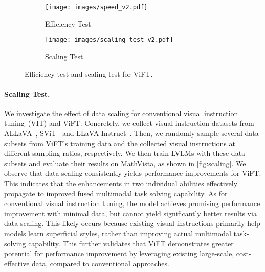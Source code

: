 \begin{figure}[t]
  \begin{subfigure}[b]{0.48\linewidth}
  \centering
    \texttt{[image: images/speed\_v2.pdf]}
    \caption{Efficiency Test}
    \label{fig:speed}
  \end{subfigure}\hfill
  \begin{subfigure}[b]{0.48\linewidth}
  \centering
    \texttt{[image: images/scaling\_test\_v2.pdf]}
    \caption{Scaling Test}
    \label{fig:scaling}
  \end{subfigure}
  \caption{Efficiency test and scaling test for ViFT.}
\end{figure}

\paragraph{Scaling Test.}
We investigate the effect of data scaling for conventional visual instruction tuning~(VIT) and ViFT. Concretely, we collect visual instruction datasets from ALLaVA~\cite{chen2024allava}, SViT~\cite{zhao2023svit} and LLaVA-Instruct~\cite{liu2024visual}. Then, we randomly sample several data subsets from ViFT's training data and the collected visual instructions at different sampling ratios, respectively. We then train LVLMs with these data subsets and evaluate their results on MathVista, as shown in \autoref{fig:scaling}. We observe that data scaling consistently yields performance improvements for ViFT. This indicates that the enhancements in two individual abilities effectively propagate to improved fused multimodal task solving capability.
As for conventional visual instruction tuning, the model achieves promising performance improvement with minimal data, but cannot yield significantly better results via data scaling. This likely occurs because existing visual instructions primarily help models learn superficial styles, rather than improving actual multimodal task-solving capability. This further validates that ViFT demonstrates greater potential for performance improvement by leveraging existing large-scale, cost-effective data, compared to conventional approaches.



